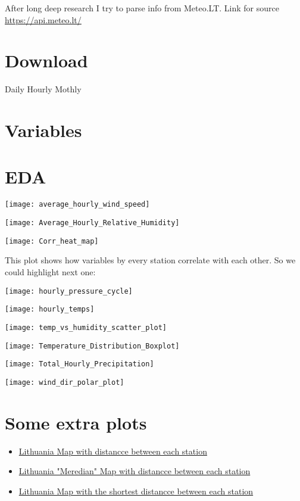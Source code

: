 \documentclass[11pt]{article}
\begin{document}
After long deep research I try to parse info from Meteo.LT.
Link for source \href{https://api.meteo.lt/}{https://api.meteo.lt/}

\tableofcontents
\newpage

\section{Download}
Daily
Hourly
Mothly

\section{Variables}


\section{EDA}
\begin{center}
    \texttt{[image: average\_hourly\_wind\_speed]}
\end{center}

\begin{center}
    \texttt{[image: Average\_Hourly\_Relative\_Humidity]}
\end{center}

\begin{center}
    \texttt{[image: Corr\_heat\_map]}
\end{center}
This plot shows how variables by every station correlate with each other.
So we could highlight next one:

\begin{center}
    \texttt{[image: hourly\_pressure\_cycle]}
\end{center}
\begin{center}
    \texttt{[image: hourly\_temps]}
\end{center}
\begin{center}
    \texttt{[image: temp\_vs\_humidity\_scatter\_plot]}
\end{center}
\begin{center}
    \texttt{[image: Temperature\_Distribution\_Boxplot]}
\end{center}
\begin{center}
    \texttt{[image: Total\_Hourly\_Precipitation]}
\end{center}
\begin{center}
    \texttt{[image: wind\_dir\_polar\_plot]}
\end{center}

\section{Some extra plots}
    \begin{itemize}
        \item \href{}{Lithuania Map with distancce between each station}
        \item \href{}{Lithuania "Meredian" Map with distancce between each station}
        \item \href{}{Lithuania Map with the shortest distancce between each station}
    \end{itemize}
\end{document}
